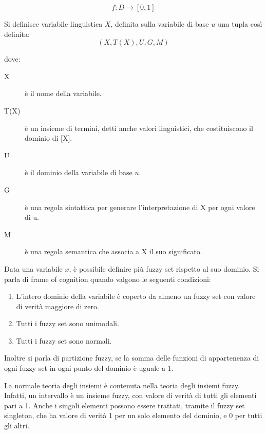 \begin{equation*}
 f:D\rightarrow [0, 1]
\end{equation*}

%


Si definisce variabile linguistica $X$, definita sulla variabile di base $u$ una tupla così definita:
\begin{equation*}
(X, T(X), U, G, M)
\end{equation*}

dove:

\begin{description}
 \item [X] è il nome della variabile.
 \item [T(X)] è un insieme di termini, detti anche valori linguistici, che costituiscono il dominio di [X].
 \item [U] è il dominio della variabile di base $u$.
 \item [G] è una regola sintattica per generare l'interpretazione di X per ogni valore di u.
 \item [M] è una regola semantica che associa a X il suo significato.
\end{description}


Data una variabile $x$, è possibile definire più fuzzy set rispetto al suo dominio. Si parla di frame of cognition quando valgono le seguenti condizioni:
\begin{enumerate}
 \item L'intero dominio della variabile è coperto da almeno un fuzzy set con valore di verità maggiore di zero.
 \item Tutti i fuzzy set sono unimodali.
 \item Tutti i fuzzy set sono normali.
\end{enumerate}

Inoltre si parla di partizione fuzzy, se la somma delle funzioni di appartenenza di ogni fuzzy set in ogni punto del dominio è uguale a 1.

La normale teoria degli insiemi è contenuta nella teoria degli insiemi fuzzy. Infatti, un intervallo è un insieme fuzzy, con valore di verità di tutti gli elementi pari a 1. Anche i singoli elementi possono essere trattati, tramite il fuzzy set singleton, che ha valore di verità 1 per un solo elemento del dominio, e 0 per tutti gli altri.

